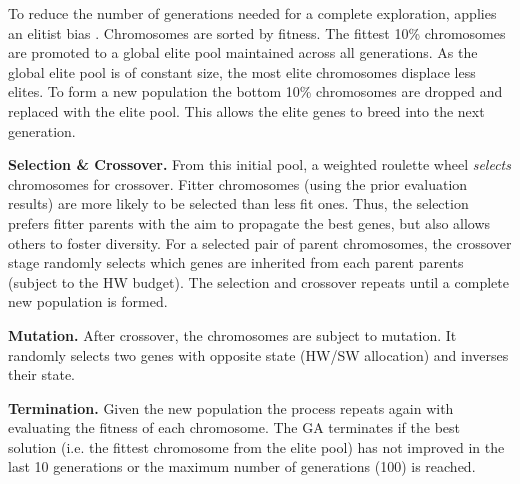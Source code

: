 To reduce the number of generations needed for a complete exploration, \ga applies an elitist bias \cite{quan2014towards}. Chromosomes are sorted by fitness. The fittest 10\% chromosomes are promoted to a global elite pool maintained across all generations. As the global elite pool is of constant size, the most elite chromosomes displace less elites. To form a new population the bottom 10\% chromosomes are dropped and replaced with the elite pool. This allows the elite genes to breed into the next generation. 



\textbf{Selection \& Crossover.}
From this initial pool, a weighted roulette wheel \emph{selects} chromosomes for crossover. Fitter chromosomes (using the prior evaluation results) are more likely to be selected than less fit ones. Thus, the selection prefers fitter parents with the aim to propagate the best genes, but also allows others to foster diversity. For a selected pair of parent chromosomes, the crossover stage randomly selects which genes are inherited from each parent parents (subject to the HW budget). The selection and crossover repeats until a complete new population is formed.

\textbf{Mutation.} 
After crossover, the chromosomes are subject to mutation. It randomly selects two genes with opposite state (HW/SW allocation) and inverses their state.  


\textbf{Termination.}
Given the new population the process repeats again with evaluating the fitness of each chromosome. The GA terminates if the best solution (i.e. the fittest chromosome from the elite pool) has not improved in the last 10 generations or the maximum number of generations (100) is reached. 




